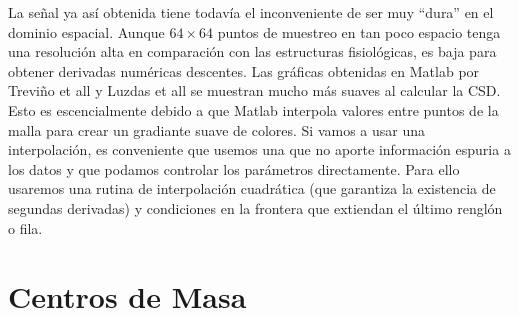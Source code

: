 \documentclass{article}
\begin{document}
 
La señal ya así obtenida tiene todavía el inconveniente
de ser muy ``dura'' en el dominio espacial. Aunque $64\times 64$
puntos de muestreo en tan poco espacio tenga una resolución
alta en comparación con las estructuras fisiológicas, es baja
para obtener derivadas numéricas descentes.
Las gráficas obtenidas en Matlab por Treviño et all y Luzdas et all
se muestran mucho más suaves al calcular la CSD. Esto es escencialmente
debido a que Matlab interpola valores entre puntos de la malla
para crear un gradiante suave de colores. Si vamos a usar una
interpolación, es conveniente que usemos una que no aporte información
espuria a los datos y que podamos controlar los parámetros directamente.
Para ello usaremos una rutina de interpolación cuadrática
(que garantiza la existencia de segundas derivadas) y condiciones
en la frontera que extiendan el último renglón o fila.



\section{Centros de Masa}






\end{document}
